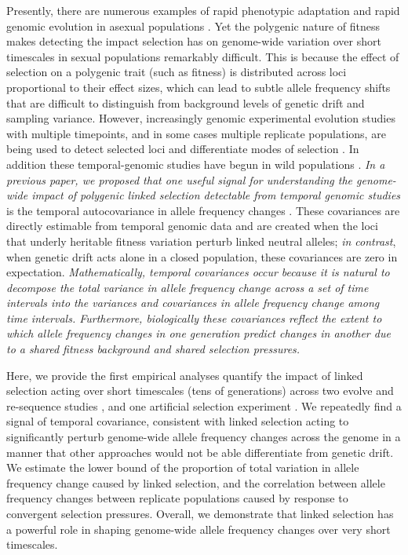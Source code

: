 \documentclass[11pt]{article}
\newcommand{\vb}[1]{{\it \color{blue} #1}}
\begin{document}
Presently, there are numerous examples of rapid phenotypic adaptation
\parencite{Grant2011-wk,Grant2006-hj,Reznick1997-mh,Franks2007-dr} and rapid
genomic evolution in asexual populations
\parencite{Good2017-om,Bennett1990-bc,Baym2016-kh}.  Yet the polygenic nature
of fitness makes detecting the impact selection has on genome-wide variation
over short timescales in sexual populations remarkably difficult. This is
because the effect of selection on a polygenic trait (such as fitness) is
distributed across loci proportional to their effect sizes, which can lead to
subtle allele frequency shifts that are difficult to distinguish from
background levels of genetic drift and sampling variance. However, increasingly
genomic experimental evolution studies with multiple timepoints, and in some
cases multiple replicate populations, are being used to detect selected loci
\parencite{Turner2011-sx,Turner2012-bm} and differentiate modes of selection
\parencite{Burke2010-tz,Barghi2019-qy,Therkildsen2019-zy}. In addition these
temporal-genomic studies have begun in wild populations
\parencite{Bergland2014-ij,Machado2018-cs}. \vb{In a previous paper, we
proposed that one useful signal for understanding the genome-wide impact of
polygenic linked selection detectable from temporal genomic studies} is the
temporal autocovariance in allele frequency changes \parencite{Buffalo2019-io}.
These covariances are directly estimable from temporal genomic data and are
created when the loci that underly heritable fitness variation perturb linked
neutral alleles; \vb{in contrast}, when genetic drift acts alone in a closed
population, these covariances are zero in expectation. \vb{Mathematically,
temporal covariances occur because it is natural to decompose the total
variance in allele frequency change across a set of time intervals into the
variances and covariances in allele frequency change among time intervals.
Furthermore, biologically these covariances reflect the extent to which
allele frequency changes in one generation predict changes in another due to
a shared fitness background and shared selection pressures.}

Here, we provide the first empirical analyses quantify the impact of linked
selection acting over short timescales (tens of generations) across two evolve
and re-sequence studies \parencite{Barghi2019-qy,Kelly2019-dc}, and one
artificial selection experiment \parencite{Castro2019-uk}. We repeatedly find a
signal of temporal covariance, consistent with linked selection acting to
significantly perturb genome-wide allele frequency changes across the genome in
a manner that other approaches would not be able differentiate from genetic
drift. We estimate the lower bound of the proportion of total variation in
allele frequency change caused by linked selection, and the correlation between
allele frequency changes between replicate populations caused by response to
convergent selection pressures. Overall, we demonstrate that linked selection
has a powerful role in shaping genome-wide allele frequency changes over very
short timescales.
\end{document}

